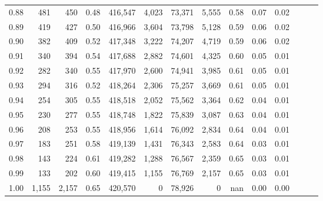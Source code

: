 \begin{tabular}{rrrrrrrrrrrrrr}
0.88 &     481 &    450 &  0.48 &  416,547 &    4,023 &  73,371 &   5,555 &  0.58 &  0.07 &      0.02 \\
0.89 &     419 &    427 &  0.50 &  416,966 &    3,604 &  73,798 &   5,128 &  0.59 &  0.06 &      0.02 \\
0.90 &     382 &    409 &  0.52 &  417,348 &    3,222 &  74,207 &   4,719 &  0.59 &  0.06 &      0.02 \\
0.91 &     340 &    394 &  0.54 &  417,688 &    2,882 &  74,601 &   4,325 &  0.60 &  0.05 &      0.01 \\
0.92 &     282 &    340 &  0.55 &  417,970 &    2,600 &  74,941 &   3,985 &  0.61 &  0.05 &      0.01 \\
0.93 &     294 &    316 &  0.52 &  418,264 &    2,306 &  75,257 &   3,669 &  0.61 &  0.05 &      0.01 \\
0.94 &     254 &    305 &  0.55 &  418,518 &    2,052 &  75,562 &   3,364 &  0.62 &  0.04 &      0.01 \\
0.95 &     230 &    277 &  0.55 &  418,748 &    1,822 &  75,839 &   3,087 &  0.63 &  0.04 &      0.01 \\
0.96 &     208 &    253 &  0.55 &  418,956 &    1,614 &  76,092 &   2,834 &  0.64 &  0.04 &      0.01 \\
0.97 &     183 &    251 &  0.58 &  419,139 &    1,431 &  76,343 &   2,583 &  0.64 &  0.03 &      0.01 \\
0.98 &     143 &    224 &  0.61 &  419,282 &    1,288 &  76,567 &   2,359 &  0.65 &  0.03 &      0.01 \\
0.99 &     133 &    202 &  0.60 &  419,415 &    1,155 &  76,769 &   2,157 &  0.65 &  0.03 &      0.01 \\
1.00 &   1,155 &  2,157 &  0.65 &  420,570 &        0 &  78,926 &       0 &   nan &  0.00 &      0.00 \\
\bottomrule
\end{tabular}
